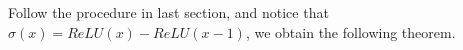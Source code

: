 %
%


Follow the procedure in last section, and notice that $\sigma(x)=ReLU(x)-ReLU(x-1)$, we obtain the following theorem.


